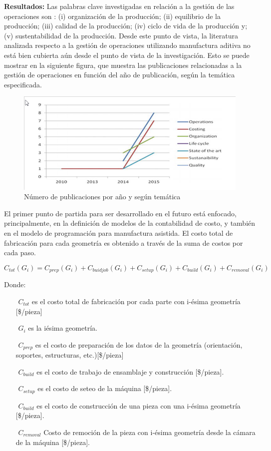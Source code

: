 \begin{description}
\item \textbf{Resultados:} Las palabras clave investigadas en relación a la gestión de las operaciones son \citep{fera2018}: (i) organización de la producción; (ii) equilibrio de la producción; (iii) calidad de la producción; (iv) ciclo de vida de la producción y; (v) sustentabilidad de la producción. Desde este punto de vista, la literatura analizada respecto a la gestión de operaciones utilizando manufactura aditiva no está bien cubierta aún desde el punto de vista de la investigación. Esto se puede mostrar en la siguiente figura, que muestra las publicaciones  relacionadas a la gestión de operaciones en función del año de publicación, según la temática especificada.

\begin{figure}[H]
\centering
\includegraphics[scale=0.7]{images/publicacionesgestion.png}
\caption{Número de publicaciones por año y según temática \citep{fera2018}}
\end{figure}

El primer punto de partida para ser desarrollado en el futuro está enfocado, principalmente, en la definición de modelos de la contabilidad de costo, y también en el modelo de programación para manufactura asistida.
El costo total de fabricación para cada geometría es obtenido a través de la suma de costos por cada paso. 


$$C_{tot}(G_i)=C_{prep}(G_i)+C_{buidjob}(G_i)+C_{setup}(G_i)+C_{build}(G_i)+C_{removal}(G_i)$$ 

Donde:

\begin{itemize}
\item[$ $] $C_{tot} $ es el costo total de fabricación por cada parte con i-ésima geometría [\$/pieza]
\item[$ $] $G_i $ es la iésima geometría.
\item[$ $] $C_{prep} $ es el costo de preparación de los datos de la geometría (orientación, soportes, estructuras, etc.)[\$/pieza]
\item[$ $] $C_{build} $ es el costo de trabajo de ensamblaje y construcción [\$/pieza].
\item[$ $] $C_{setup} $ es el costo de seteo de la máquina [\$/pieza].
\item[$ $] $C_{build} $ es el costo de construcción de una pieza con una i-ésima geometría [\$/pieza].
\item[$ $] $C_{removal} $ Costo de remoción de la pieza con i-ésima geometría desde la cámara de la máquina [\$/pieza].
\end{itemize}


\end{description}
